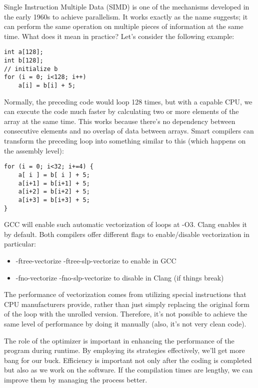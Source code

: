 Single Instruction Multiple Data (SIMD) is one of the mechanisms developed in the early 1960s to achieve parallelism. It works exactly as the name suggests; it can perform the same operation on multiple pieces of information at the same time. What does it mean in practice? Let's consider the following example:

\begin{lstlisting}[style=styleCXX]
int a[128];
int b[128];
// initialize b
for (i = 0; i<128; i++)
	a[i] = b[i] + 5;
\end{lstlisting}

Normally, the preceding code would loop 128 times, but with a capable CPU, we can execute the code much faster by calculating two or more elements of the array at the same time. This works because there's no dependency between consecutive elements and no overlap of data between arrays. Smart compilers can transform the preceding loop into something similar to this (which happens on the assembly level):

\begin{lstlisting}[style=styleCXX]
for (i = 0; i<32; i+=4) {
	a[ i ] = b[ i ] + 5;
	a[i+1] = b[i+1] + 5;
	a[i+2] = b[i+2] + 5;
	a[i+3] = b[i+3] + 5;
}
\end{lstlisting}

GCC will enable such automatic vectorization of loops at -O3. Clang enables it by default. Both compilers offer different flags to enable/disable vectorization in particular:

\begin{itemize}
\item 
-ftree-vectorize -ftree-slp-vectorize to enable in GCC

\item 
-fno-vectorize -fno-slp-vectorize to disable in Clang (if things break)
\end{itemize}

The performance of vectorization comes from utilizing special instructions that CPU manufacturers provide, rather than just simply replacing the original form of the loop with the unrolled version. Therefore, it's not possible to achieve the same level of performance by doing it manually (also, it's not very clean code).

The role of the optimizer is important in enhancing the performance of the program during runtime. By employing its strategies effectively, we'll get more bang for our buck. Efficiency is important not only after the coding is completed but also as we work on the software. If the compilation times are lengthy, we can improve them by managing the process better.




